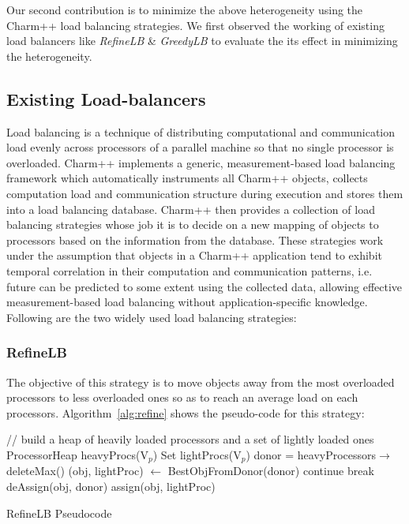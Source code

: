 Our second contribution is to minimize the above heterogeneity using the
Charm++ load balancing strategies.  We first observed the working of existing load
balancers like \emph{RefineLB} \& \emph{GreedyLB} to evaluate the its effect in
minimizing the heterogeneity. 
 
\subsection{Existing Load-balancers} 
Load balancing is a technique of distributing computational and communication
load evenly across processors of a parallel machine so that no single processor
is overloaded.  Charm++ implements a generic, measurement-based load balancing
framework which automatically instruments all Charm++ objects, collects
computation load and communication structure during execution and stores them
into a load balancing database.  Charm++ then provides a collection of load
balancing strategies whose job it is to decide on a new mapping of objects to
processors based on the information from the database.  These strategies work
under the assumption that objects in a Charm++ application tend to exhibit
temporal correlation in their computation and communication patterns, i.e.
future can be predicted to some extent using the collected data, allowing
effective measurement-based load balancing without application-specific
knowledge. Following are the two widely used load balancing strategies:

\subsubsection{RefineLB}
The objective of this strategy is to move objects away from the most overloaded
processors to less overloaded ones so as to reach an average load on each
processors. Algorithm~\ref{alg:refine} shows the pseudo-code for this strategy:

\begin{algorithm}
  // build a heap of heavily loaded processors and a set of lightly loaded ones\;
  ProcessorHeap heavyProcs(V$_p$)\;
  Set lightProcs(V$_p$)\; 
   {
    donor =   heavyProcessors$\rightarrow$deleteMax()\;
     {
      (obj, lightProc)  $\leftarrow$ BestObjFromDonor(donor)\;
       {
        continue\;
      } 
       {
        break\;
      }
      deAssign(obj, donor)\;
      assign(obj, lightProc)\;
    }
  }
 \caption{RefineLB Pseudocode}
 \label{alg:refine}
\end{algorithm}

